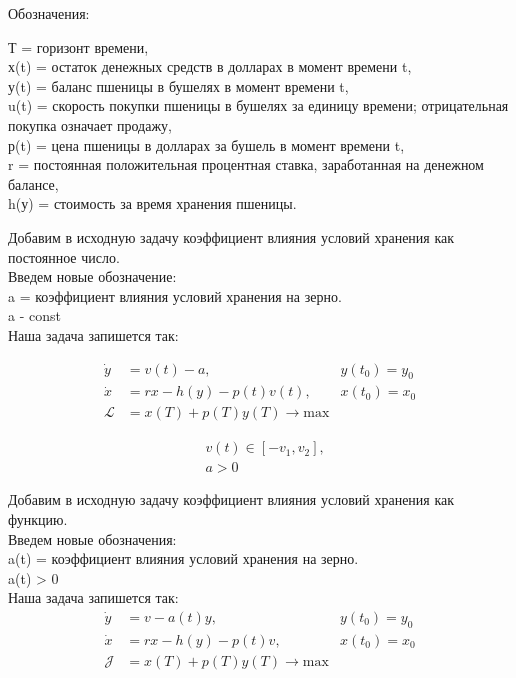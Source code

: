 Обозначения:
 
{Т} = горизонт времени,\\
{х(t)} = остаток денежных средств в долларах в момент времени t,\\
{у(t)} = баланс пшеницы в бушелях в момент времени t,\\ 
{u(t)} = скорость покупки пшеницы в бушелях за единицу времени; отрицательная покупка означает продажу,\\
{р(t)} = цена пшеницы в долларах за бушель в момент времени t,\\
{r} = постоянная положительная процентная ставка, заработанная на денежном балансе,\\
{h(у)} = стоимость за время хранения пшеницы.


Добавим в исходную задачу коэффициент влияния условий хранения как постоянное число.\\

Введем новые обозначение:\\
{a} = коэффициент влияния условий хранения на зерно.\\
a - const\\
Наша задача запишется так:

\begin{align}
    \Dot{y} & = v(t) - a, & y(t_{0}) = y_{0} \\
    \Dot{x} & = r x - h(y) - p(t) v(t), & x(t_{0}) = x_{0} \\
    \mathcal{L} & = x(T) + p(T) y(T) \to \mathrm{max}
\end{align}

\begin{align}
    & v(t) \in [-v_{1}, v_{2}], \\
    & a > 0
\end{align}






Добавим в исходную задачу коэффициент влияния условий хранения как функцию.\\
Введем новые обозначения:\\
{a(t)} = коэффициент влияния условий хранения на зерно.\\
a(t) > 0\\
 Наша задача запишется так:\\

\begin{align}
    \Dot{y} & = v - a(t) y, & y(t_{0}) = y_{0} \\
    \Dot{x} & = r x - h(y) - p(t) v, & x(t_{0}) = x_{0} \\
    \mathcal{J} & = x(T) + p(T) y(T) \to \mathrm{max}
\end{align}

